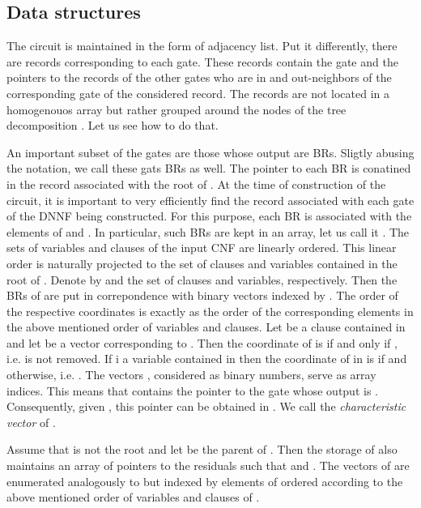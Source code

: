 \documentclass{llncs}
\begin{document}
\subsection{Data structures}
The circuit is maintained in the form of adjacency list. Put it differently, there are records corresponding to each gate.
These records contain the gate and the pointers to the records of the other gates who are in and out-neighbors of
the corresponding gate of the considered record. The records are not located in a homogenouos array but rather grouped
around the nodes of the tree decomposition . Let us see how to do that. 

An important subset of the gates are those whose output are BRs. 
Sligtly abusing the notation, we call these gats BRs as well. 
The pointer to each BR  is conatined in the
record associated with the root of . At the time of construction of the circuit, it is important to very efficiently
find the record associated with each gate of the DNNF being constructed. For this purpose, each BR 
is associated with the elements of  and . In particular, such BRs are kept in an array, let us call it .
The sets of variables and clauses of the input CNF are linearly ordered. This linear order is naturally projected to the
set of clauses and variables contained in the root  of . Denote by  and  the set of clauses
and variables, respectively. Then the BRs  of  are put in correpondence with binary vectors indexed by .
The order of the respective coordinates is exactly as the order of the corresponding elements in the above mentioned order
of variables and clauses. Let  be a clause contained in  and let  be a vector corresponding to .
Then the coordinate of  is  if and only if , i.e.  is not removed. If  i a variable contained in 
then the coordinate of  in  is  if  and  otherwise, i.e. . The vectors , considered
as binary numbers, serve as array indices. This means that   contains the pointer to the gate whose output 
is . Consequently, given , this pointer can be obtained in  . We call  the \emph{characteristic vector}
of .

Assume that  is not the root and let  be the parent of . Then the storage of  also maintains 
an array  of pointers to the residuals  such that  and
. The vectors of  are enumerated analogously to 
but indexed by elements of  ordered according to the above
mentioned order of variables and clauses of .
\end{document}
